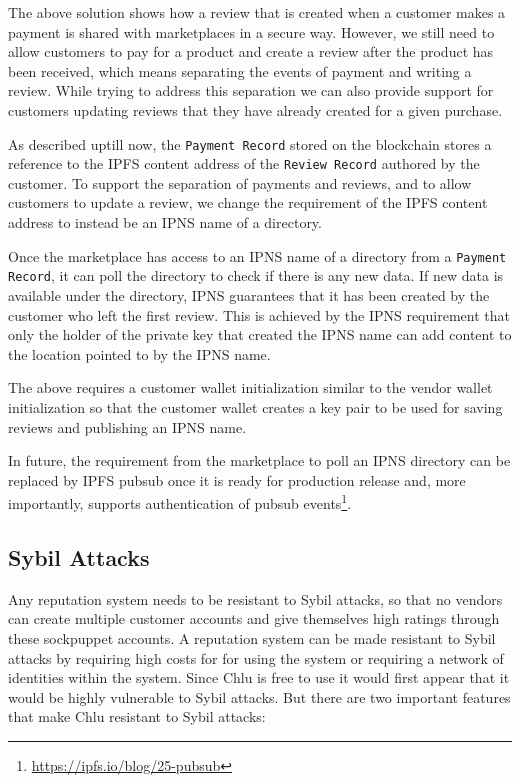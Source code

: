 \documentclass[a4paper]{article}
\begin{document}
The above solution shows how a review that is created when a customer
makes a payment is shared with marketplaces in a secure way. However,
we still need to allow customers to pay for a product and create a
review after the product has been received, which means separating the
events of payment and writing a review. While trying to address this
separation we can also provide support for customers updating reviews
that they have already created for a given purchase.

As described uptill now, the \texttt{Payment Record} stored on the
blockchain stores a reference to the IPFS content address of the
\texttt{Review Record} authored by the customer. To support the
separation of payments and reviews, and to allow customers to update a
review, we change the requirement of the IPFS content address to
instead be an IPNS name of a directory.

Once the marketplace has access to an IPNS name of a directory from a
\texttt{Payment Record}, it can poll the directory to check if there
is any new data. If new data is available under the directory, IPNS
guarantees that it has been created by the customer who left the first
review. This is achieved by the IPNS requirement that only the holder
of the private key that created the IPNS name can add content to the
location pointed to by the IPNS name.

The above requires a customer wallet initialization similar to the
vendor wallet initialization so that the customer wallet creates a key
pair to be used for saving reviews and publishing an IPNS name.

In future, the requirement from the marketplace to poll an IPNS
directory can be replaced by IPFS pubsub once it is ready for
production release and, more importantly, supports authentication of
pubsub events\footnote{\url{https://ipfs.io/blog/25-pubsub}}.

\subsection{Sybil Attacks}

Any reputation system needs to be resistant to Sybil attacks, so that
no vendors can create multiple customer accounts and give themselves
high ratings through these sockpuppet accounts. A reputation system
can be made resistant to Sybil attacks by requiring high costs for for
using the system or requiring a network of identities within the
system. Since Chlu is free to use it would first appear that it would
be highly vulnerable to Sybil attacks. But there are two important
features that make Chlu resistant to Sybil attacks:
\end{document}
